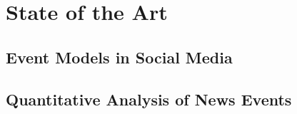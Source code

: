 \chapter{State of the Art}


\section{Event Models in Social Media}

\section{Quantitative Analysis of News Events}
